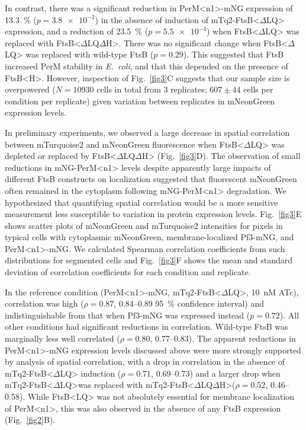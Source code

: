 \documentclass[twocolumn,pdflatex,sn-nature]{sn-jnl}%
\def\textsuperscript#1{<#1>}%
\newcommand\ec{\textit{E.~coli}}
\newcommand\ftsbLQ{FtsB\textsuperscript{LQ}}
\newcommand\ftsbH{FtsB\textsuperscript{H}}
\newcommand\ftsbdLQ{FtsB\textsuperscript{$\Delta{}$LQ}}
\newcommand\ftsbdLQdH{FtsB\textsuperscript{$\Delta{}$LQ$\Delta{}$H}}
\newcommand\permN{PerM\textsuperscript{n1}}
\begin{document}
In contrast, there was a significant reduction in \permN{}-mNG expression of \qty{13.3}{\percent} ($p=\num{3.8e-2}$) in the absence of induction of mTq2-\ftsbdLQ{} expression, and a reduction of \qty{23.5}{\percent} ($p=\num{5.5e-4}$) when \ftsbdLQ{} was replaced with \ftsbdLQdH{}.
There was no significant change when \ftsbdLQ{} was replaced with wild-type FtsB ($p=0.29$). This suggested that FtsB increased PerM stability in \ec{}, and that this depended on the presence of \ftsbH{}.
However, inspection of Fig.~\ref{fig3}C suggests that our sample size is overpowered ($N=\num{10930}$ cells in total from 3 replicates; $607 \pm 44$ cells per condition per replicate) given variation between replicates in mNeonGreen expression levels. 

In preliminary experiments, we observed a large decrease in spatial correlation between mTurquoise2 and mNeonGreen fluorescence when \ftsbdLQ{} was depleted or replaced by \ftsbdLQdH{} (Fig.~\ref{fig3}D).
The observation of small reductions in mNG-\permN{} levels despite apparently large impacts of different FtsB constructs on localization suggested that fluorescent mNeonGreen often remained in the cytoplasm following mNG-\permN{} degradation.
We hypothesized that quantifying spatial correlation would be a more sensitive measurement less susceptible to variation in protein expression levels.
Fig.~\ref{fig3}E shows scatter plots of mNeonGreen and mTurquoise2 intensities for pixels in typical cells with cytoplasmic mNeonGreen, membrane-localized Pf3-mNG, and \permN{}-mNG.
We calculated Spearman correlation coefficients from such distributions for segmented cells and Fig.~\ref{fig3}F shows the mean and standard deviation of correlation coefficients for each condition and replicate.

In the reference condition (\permN{}-mNG, mTq2-\ftsbdLQ, \qty{10}{nM} ATc), correlation was high ($\rho = 0.87$, 0.84--0.89 \qty{95}{\percent} confidence interval) and indistinguishable from that when Pf3-mNG was expressed instead ($p = 0.72$).
All other conditions had significant reductions in correlation. Wild-type FtsB was marginally less well correlated ($\rho = 0.80$, 0.77--0.83).
The apparent reductions in \permN{}-mNG expression levels discussed above were more strongly supported by analysis of spatial correlation, with a drop in correlation in the absence of mTq2-\ftsbdLQ{} induction ($\rho = 0.71$, 0.69--0.73) and a larger drop when mTq2-\ftsbdLQ was replaced with mTq2-\ftsbdLQdH ($\rho = 0.52$, 0.46--0.58).
While \ftsbLQ{} was not absolutely essential for membrane localization of \permN{}, this was also observed in the absence of any FtsB expression (Fig.~\ref{fig2}B).
\end{document}
